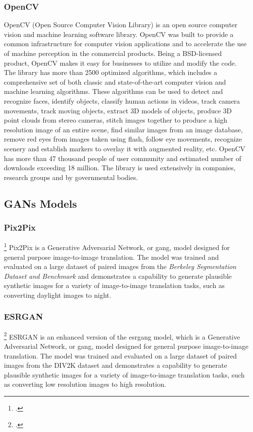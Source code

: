 \subsubsection*{OpenCV}\label{subsubsec:opencv}
OpenCV (Open Source Computer Vision Library) is an open source computer vision
and machine learning software library. OpenCV was built to provide a common
infrastructure for computer vision applications and to accelerate the use of
machine perception in the commercial products. Being a BSD-licensed product,    
OpenCV makes it easy for businesses to utilize and modify the code. The library
has more than 2500 optimized algorithms, which includes a comprehensive set of
both classic and state-of-the-art computer vision and machine learning
algorithms. These algorithms can be used to detect and recognize faces, identify
objects, classify human actions in videos, track camera movements, track moving
objects, extract 3D models of objects, produce 3D point clouds from stereo
cameras, stitch images together to produce a high resolution image of an entire
scene, find similar images from an image database, remove red eyes from images
taken using flash, follow eye movements, recognize scenery and establish markers
to overlay it with augmented reality, etc. OpenCV has more than 47 thousand
people of user community and estimated number of downloads exceeding 18 million.
The library is used extensively in companies, research groups and by governmental
bodies.
\subsection*{GANs Models}\label{subsec:gans-models}
\subsubsection*{Pix2Pix}\footcite{paper:pix2pix}\label{subsubsec:pix2pix}
Pix2Pix is a Generative Adversarial Network, or \gls{gang}, model designed for general
purpose image-to-image translation. The model was trained and evaluated on a
large dataset of paired images from the \textit{Berkeley Segmentation Dataset
and Benchmark} and demonstrates a capability to generate plausible synthetic
images for a variety of image-to-image translation tasks, such as converting
daylight images to night.

\subsubsection*{ESRGAN}\footcite{paper:esrgan}\label{subsubsec:esrgan}
ESRGAN is an enhanced version of the \gls{esrgang} model, which is a Generative
Adversarial Network, or \gls{gang}, model designed for general purpose
image-to-image translation. The model was trained and evaluated on a large
dataset of paired images from the DIV2K dataset and demonstrates a capability to
generate plausible synthetic images for a variety of image-to-image translation
tasks, such as converting low resolution images to high resolution.

